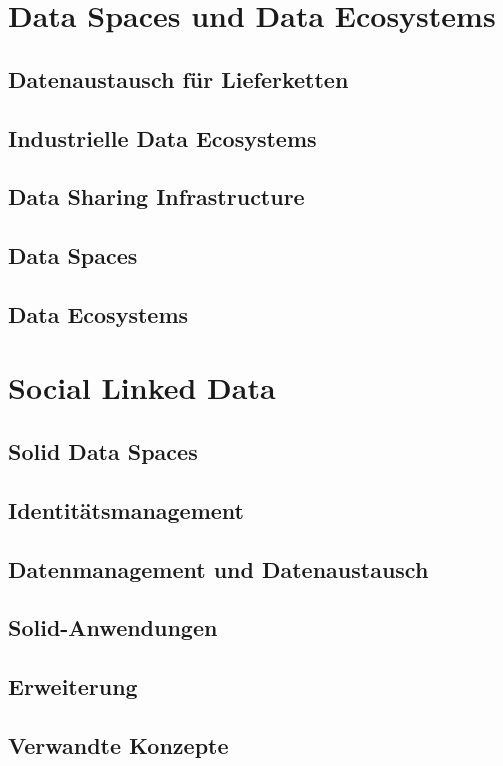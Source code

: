 
\section{Data Spaces und Data Ecosystems}

\subsection{Datenaustausch für Lieferketten}
\subsection{Industrielle Data Ecosystems}
\subsection{Data Sharing Infrastructure}
\subsection{Data Spaces}
\subsection{Data Ecosystems}


\clearpage
\section{Social Linked Data}

\subsection{Solid Data Spaces}

\subsection{Identitätsmanagement}

\subsection{Datenmanagement und Datenaustausch}

\subsection{Solid-Anwendungen}

\subsection{Erweiterung}

\subsection{Verwandte Konzepte}
